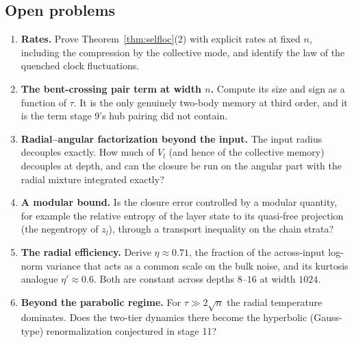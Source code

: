 \subsection{Open problems}
\begin{enumerate}[leftmargin=*]
\item \textbf{Rates.} Prove Theorem~\ref{thm:selfloc}(2) with explicit rates at fixed $n$, including the compression by the collective mode, and
identify the law of the quenched clock fluctuations.
\item \textbf{The bent-crossing pair term at width $n$.} Compute its size and sign as a function of $\tau$. It is the only genuinely
two-body memory at third order, and it is the term stage 9's hub pairing did not contain.
\item \textbf{Radial--angular factorization beyond the input.} The input radius decouples exactly. How much of $V_l$ (and hence of the
collective memory) decouples at depth, and can the closure be run on the angular part with the radial mixture integrated exactly?
\item \textbf{A modular bound.} Is the closure error controlled by a modular quantity, for example the relative entropy of the layer
state to its quasi-free projection (the negentropy of $z_l$), through a transport inequality on the chain strata?
\item \textbf{The radial efficiency.} Derive $\eta\approx0.71$, the fraction of the across-input log-norm variance that acts as a common
scale on the bulk noise, and its kurtosis analogue $\eta'\approx0.6$. Both are constant across depths $8$--$16$ at width $1024$.
\item \textbf{Beyond the parabolic regime.} For $\tau\gg2\sqrt n$ the radial temperature dominates. Does the two-tier dynamics there
become the hyperbolic (Gauss-type) renormalization conjectured in stage 11?
\end{enumerate}

